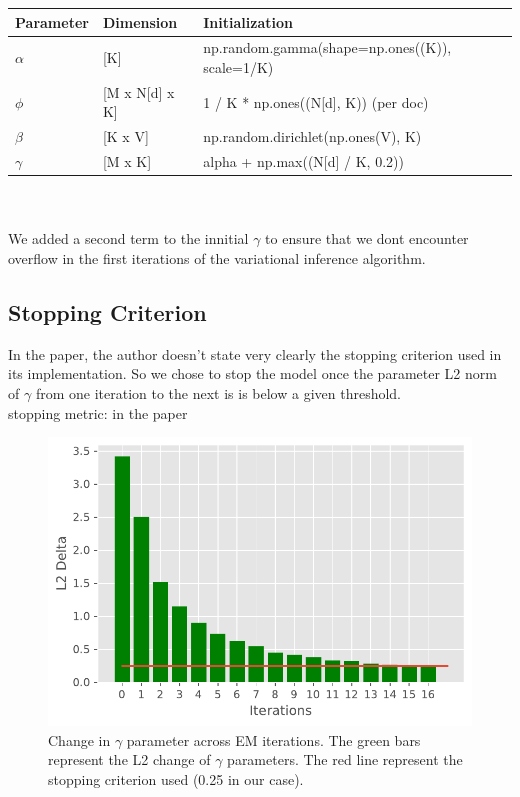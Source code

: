 \documentclass[11pt]{article}
\begin{document}
\begin{tabular}{ |p{2cm}||p{3cm}|p{10cm}| }
 \hline
 Parameter & Dimension  & Initialization\\
 \hline
  $\alpha$ & [K]   & np.random.gamma(shape=np.ones((K)), scale=1/K)\\
  $\phi$  & [M x N[d] x K]  & 1 / K * np.ones((N[d], K)) (per doc)\\
  $\beta$  & [K x V]  &  np.random.dirichlet(np.ones(V), K)\\
  $\gamma $  & [M x K]  &  alpha + np.max((N[d] / K, 0.2)) \\
  \hline
\end{tabular}\\
\\
We added a second term to the innitial $\gamma $ to ensure that we dont encounter overflow in the first iterations of the variational inference algorithm.
\\
\subsection{Stopping Criterion}
In the paper, the author doesn't state very clearly the stopping criterion used in its implementation. So we chose to stop the model once the parameter L2 norm of $\gamma$   from one iteration to the next is is below a given threshold. 
\\
stopping metric:
in the paper

\begin{figure}[ht]
\vskip 0.2in
\begin{center}
\centerline{\includegraphics[width=\columnwidth]{plot_delta_gamma_convergence}}
\caption{Change in $\gamma$ parameter across EM iterations. The green bars represent the L2 change of  $\gamma$ parameters. The red line represent the stopping criterion  used (0.25 in our case).}
\label{icml-historical}
\end{center}
\vskip -0.2in
\end{figure}
\end{document}

